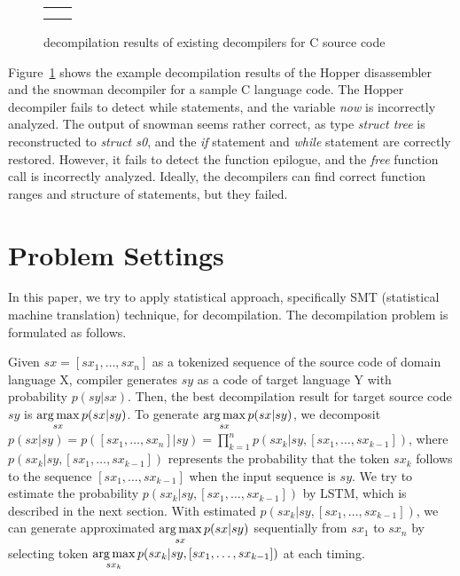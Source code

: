 \documentclass[senior,final,11pt]{iscs-thesis}
\newcommand{\argmax}{\mathop{\rm arg\,max}\limits}
\begin{document}

\begin{figure}
	\begin{tabular}{cc}
		\begin{minipage}[c]{0.5\hsize}
			
		\end{minipage}
		\\
		\begin{minipage}[c]{0.5\hsize}
			
		\end{minipage}
		\begin{minipage}[c]{0.5\hsize}
			
		\end{minipage}
	\end{tabular}
	\vspace*{-0.6cm}
	\caption{ decompilation results of existing decompilers for C source code}
	\label{fig:cw}
\end{figure}


Figure~\ref{fig:cw} shows the example decompilation results of the Hopper disassembler and the snowman decompiler 
for a sample C language code.
The Hopper decompiler fails to detect while statements, and the variable {\sl now} is incorrectly analyzed.
The output of snowman seems rather correct, as type {\sl struct tree} is reconstructed to {\sl struct s0}, 
and the {\sl if} statement and {\sl while} statement are correctly restored. 
However, it fails to detect the function epilogue, and the {\sl free} function call is incorrectly analyzed.
Ideally, the decompilers can find correct function ranges and structure of statements, but they failed.


\section{Problem Settings}

In this paper, we try to apply statistical approach, specifically SMT (statistical machine translation) technique, for decompilation.
The decompilation problem is formulated as follows. 

Given $sx = [sx_1, \dots, sx_n] $ as a tokenized sequence of the source code of domain language X, compiler generates $sy$ as a code of target language Y with probability $p(sy|sx)$.
Then, the best decompilation result for target source code $sy$ is $ \argmax_{sx} p(sx|sy)$. 
To generate $ \argmax_{sx} p(sx|sy)$, we decomposit $ p(sx|sy) = p([sx_1, \dots, sx_n] |sy) = \prod_{k=1}^{n} p(sx_k|sy,[sx_1,\dots,sx_{k-1}]) $,
where $ p(sx_k|sy,[sx_1,\dots,sx_{k-1}]) $ represents the probability that the token $ sx_k $ follows to the sequence $ [sx_1,\dots,sx_{k-1}] $ 
when the input sequence is $ sy $. 
We try to estimate the probability $ p(sx_k|sy,[sx_1,\dots,sx_{k-1}]) $ by LSTM, which is described in the next section.
With estimated $ p(sx_k|sy,[sx_1,\dots,sx_{k-1}]) $, we can generate approximated $ \argmax_{sx} p(sx|sy)$ sequentially from $sx_1$ to $sx_n$ by selecting token $ \argmax_{sx_{k}} p(sx_k|sy,[sx_1,\dots,sx_{k-1}]) $ at each timing.
\end{document}
